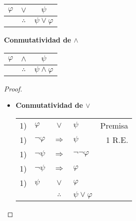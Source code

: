 \documentclass[12pt]{report}
\theoremstyle{largebreak}
\begin{document}
\begin{propo}
\begin{center}
        \end{center}
        \begin{center}
            \begin{tabular}{c c c}
                $\varphi$ & $\lor$ & $\psi$ \\
                \hline
                 & $\therefore$ & $\psi\lor\varphi$ \\
            \end{tabular}
        \end{center}
        \begin{center}
            \textbf{Conmutatividad de $\land$}
        \end{center}
        \begin{center}
            \begin{tabular}{c c c}
                $\varphi$ & $\land$ & $\psi$ \\
                \hline
                 & $\therefore$ & $\psi\land\varphi$ \\
            \end{tabular}
        \end{center}
    \end{propo}

    \begin{proof}
        \begin{itemize}
            \item \textbf{Conmutatividad de $\lor$}
            \begin{center}
                \begin{tabular}{l l c l r}
                    1) & $\varphi$ & $\lor$ & $\psi$ & Premisa \\
                    1) & $\neg\varphi$ & $\Rightarrow$ & $\psi$ & 1 R.E. \\
                    1) & $\neg\psi$ & $\Rightarrow$ & $\neg\neg\varphi$ &  \\
                    1) & $\neg\psi$ & $\Rightarrow$ & $\varphi$ &  \\
                    1) & $\psi$ & $\lor$ & $\varphi$ &  \\
                    \hline
                    & & $\therefore$ & $\psi\lor\varphi$ & \\
                \end{tabular}
            \end{center}
        \end{itemize}
    \end{proof}
\end{document}
